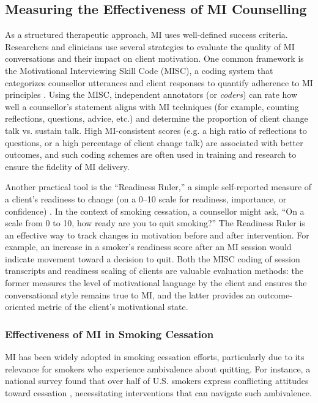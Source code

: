 \subsection{Measuring the Effectiveness of MI Counselling}
As a structured therapeutic approach, MI uses well-defined success criteria. Researchers and clinicians use several strategies to evaluate the quality of MI conversations and their impact on client motivation. One common framework is the Motivational Interviewing Skill Code (MISC), a coding system that categorizes counsellor utterances and client responses to quantify adherence to MI principles \cite{Houck2010}. Using the MISC, independent annotators (or \emph{coders}) can rate how well a counsellor's statement aligns with MI techniques (for example, counting reflections, questions, advice, etc.) and determine the proportion of client change talk vs. sustain talk. High MI-consistent scores (e.g. a high ratio of reflections to questions, or a high percentage of client change talk) are associated with better outcomes, and such coding schemes are often used in training and research to ensure the fidelity of MI delivery.

Another practical tool is the ``Readiness Ruler,'' a simple self-reported measure of a client’s readiness to change (on a 0–10 scale for readiness, importance, or confidence) \cite{Boudreaux2012}. In the context of smoking cessation, a counsellor might ask, ``On a scale from 0 to 10, how ready are you to quit smoking?'' The Readiness Ruler is an effective way to track changes in motivation before and after intervention. For example, an increase in a smoker's readiness score after an MI session would indicate movement toward a decision to quit. Both the MISC coding of session transcripts and readiness scaling of clients are valuable evaluation methods: the former measures the level of motivational language by the client and ensures the conversational style remains true to MI, and the latter provides an outcome-oriented metric of the client’s motivational state.

\subsubsection{Effectiveness of MI in Smoking Cessation}
MI has been widely adopted in smoking cessation efforts, particularly due to its relevance for smokers who experience ambivalence about quitting. For instance, a national survey found that over half of U.S. smokers express conflicting attitudes toward cessation \cite{Babb2017}, necessitating interventions that can navigate such ambivalence.

